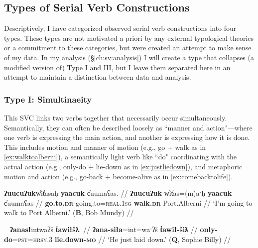 \subsection{Types of Serial Verb Constructions}

Descriptively, I have categorized observed serial verb constructions into four types. These types are not motivated a priori by any external typological theories or a commitment to these categories, but were created an attempt to make sense of my data. In my analysis (\S\ref{ch:sv:analysis}) I will create a type that collapses (a modified version of) Type I and III, but I leave them separated here in an attempt to maintain a distinction between data and analysis.

\vspace{10pt}

\subsubsection{Type I: Simultinaeity} \label{ch:sv:data:type1}

\vspace{10pt}

This SVC links two verbs together that necessarily occur simultaneously. Semantically, they can often be described loosely as ``manner and action"---where one verb is expressing the main action, and another is expressing how it is done. This includes motion and manner of motion (e.g., go + walk as in \ref{ex:walktoalberni}), a semantically light verb like ``do" coordinating with the actual action (e.g., only-do + lie-down as in \ref{ex:justliedown}), and metaphoric motion and action (e.g., go-back + become-alive as in \ref{ex:comebacktolife}).

\ex \label{ex:walktoalberni}
\begingl
\glpreamble \textbf{ʔuucuʔuk}w̓it̓asaḥ \textbf{yaacuk} c̓uumaʕas. //
\gla \textbf{ʔuucuʔuk}-w̓it̓as=(m)aˑḥ \textbf{yaacuk} c̓uumaʕas //
\glb \textbf{go.to.\textsc{dr}}-going.to=\textsc{real.1sg} \textbf{walk.\textsc{dr}} Port.Alberni //
\glft `I'm going to walk to Port Alberni.' (\textbf{B}, Bob Mundy) //
\endgl
\xe

\ex~ \label{ex:justliedown}
\begingl
\glpreamble \textbf{ʔanasł}intwaʔš \textbf{t̓awiłšƛ}. //
\gla \textbf{ʔana-siła}=int=waˑʔš \textbf{t̓awił-šiƛ} //
\glb \textbf{only-do}=\textsc{pst}=\textsc{hrsy.3} \textbf{lie.down-\textsc{mo}} //
\glft `He just laid down.' (\textbf{Q}, Sophie Billy) //
\endgl
\xe

\begin{comment}
\ex~ \label{ex:goaheadwent}
\begingl
\glpreamble nay̓iiʔak̓aƛin \textbf{kuw̓iła} \textbf{wałaak}. //
\gla nay̓iiʔak=!aƛ=(m)in \textbf{kuw̓iła} \textbf{wałaak} //
\glb immediately=\textsc{now}=\textsc{real.1pl} \textbf{go.ahead} \textbf{go.to.\textsc{dr}} //
\glft `We immediately went ahead and went.' (\textbf{B}, Marjorie Touchie) //
\endgl
\xe
\end{comment}


